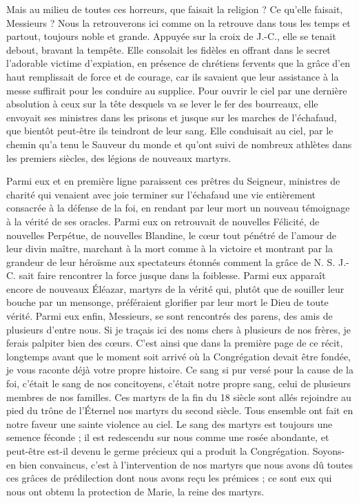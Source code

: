 Mais au milieu de toutes ces horreurs, que faisait la religion ? Ce qu'elle faisait, Messieurs ? Nous la retrouverons ici comme on la retrouve dans tous les temps et partout, toujours noble et grande. Appuyée sur la croix de J.-C., elle se tenait debout,
bravant la tempête. Elle consolait les fidèles en offrant dans le secret l'adorable victime d'expiation, en présence de chrétiens fervents que la grâce d'en haut remplissait de force et de courage, car ils savaient que leur assistance à la messe suffirait pour les conduire au supplice. Pour ouvrir le ciel par une dernière absolution à ceux sur la tête desquels va se lever le fer des bourreaux, elle envoyait ses ministres dans les prisons et jusque sur les marches de l'échafaud, que bientôt peut-être ils teindront de leur sang. Elle conduisait au ciel, par le chemin qu'a tenu le Sauveur du monde et qu'ont suivi de nombreux athlètes dans les premiers siècles, des légions de nouveaux martyrs.

Parmi eux et en première ligne paraissent ces prêtres du Seigneur, ministres de charité qui venaient avec joie terminer sur l'échafaud une vie entièrement consacrée à la défense de la foi, en rendant par leur mort un nouveau témoignage à la vérité de ses oracles. Parmi eux on retrouvait de nouvelles Félicité, de nouvelles Perpétue, de nouvelles Blandine, le cœur tout pénétré de l'amour de leur divin maître, marchant à la mort comme à la victoire et montrant par la grandeur de leur héroïsme aux spectateurs étonnés comment la grâce de N. S. J.-C. sait faire rencontrer la force jusque dans la foiblesse. Parmi eux apparaît encore de nouveaux Éléazar, martyrs de la vérité qui, plutôt que de souiller leur bouche par un mensonge, préféraient glorifier par leur mort le Dieu de toute vérité. Parmi eux enfin, Messieurs, se sont rencontrés des parens,
des amis de plusieurs d'entre nous. Si je traçais ici des noms chers à plusieurs de nos frères, je ferais palpiter bien des cœurs. C'est ainsi que dans la première page de ce récit, longtemps avant que le moment soit arrivé où la Congrégation devait être fondée, je vous raconte déjà votre propre histoire. Ce sang si pur versé pour la cause de la foi, c'était le sang de nos concitoyens, c'était notre propre sang, celui de plusieurs membres de nos familles. Ces martyrs de la fin du 18 siècle sont allés rejoindre au pied du trône de l'Éternel nos martyrs du second siècle. Tous ensemble ont fait en notre faveur une sainte violence au ciel. Le sang des martyrs est toujours une semence féconde ; il est redescendu sur nous comme une rosée abondante, et peut-être est-il devenu le germe précieux qui a produit la Congrégation. Soyons-en bien convaincus, c'est à l'intervention de nos martyrs que nous avons dû toutes ces grâces de prédilection dont nous avons reçu les prémices ; ce sont eux qui nous ont obtenu la protection de Marie, la reine des martyrs.

